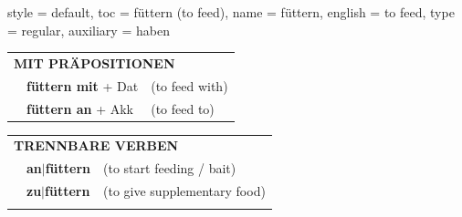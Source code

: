 \begin{verbentry}{
  style = {default},
  toc = {füttern (to feed)},
  name = {füttern},
  english = {to feed},
  type = {regular},
  auxiliary = {haben}
}
   \vspace{10pt}

   \begin{tabular}{lll}
      \multicolumn{3}{l}{\textbf{MIT PRÄPOSITIONEN}}\\
& \textbf{füttern mit} + Dat & (to feed with)\\
& \textbf{füttern an} + Akk & (to feed to)\\
\end{tabular}
  \hfill
   \begin{tabular}{lll}
      \multicolumn{3}{l}{\textbf{TRENNBARE VERBEN}}\\
 & \textbf{an$|$füttern} & (to start feeding / bait)\\
 & \textbf{zu$|$füttern} & (to give supplementary food)\\
\vspace{10pt}
  \end{tabular}

  \vspace{-5pt}
\end{verbentry}
